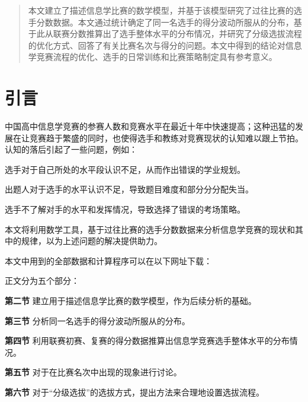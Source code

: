 \begin{abstract}
    本文建立了描述信息学比赛的数学模型，并基于该模型研究了过往比赛的选手分数数据。本文通过统计确定了同一名选手的得分波动所服从的分布，基于此从联赛分数推算出了选手整体水平的分布情况，并研究了分级选拔流程的优化方式、回答了有关比赛名次与得分的问题。本文中得到的结论对信息学竞赛流程的优化、选手的日常训练和比赛策略制定具有参考意义。
\end{abstract}

\section{引言}

    中国高中信息学竞赛的参赛人数和竞赛水平在最近十年中快速提高；这种迅猛的发展在让竞赛趋于繁盛的同时，也使得选手和教练对竞赛现状的认知难以跟上节拍。认知的落后引起了一些问题，例如：
    \begin{asparaitem}
        \item {选手对于自己所处的水平段认识不足，从而作出错误的学业规划。}
        \item {出题人对于选手的水平认识不足，导致题目难度和部分分分配失当。}
        \item {选手不了解对手的水平和发挥情况，导致选择了错误的考场策略。}
    \end{asparaitem}

    本文将利用数学工具，基于过往比赛的选手分数数据来分析信息学竞赛的现状和其中的规律，以为上述问题的解决提供助力。

    \vspace{1.5ex}

    \begin{samepage}
        本文中用到的全部数据和计算程序可以在以下网址下载：\nobreak
        \begin{compactitem}
            \item {}
            \item {}
        \end{compactitem}
    \end{samepage}

    \vspace{1.5ex}

    正文分为五个部分：

    \begin{asparaenum}
        \item [\textbf{第二节}]{建立用于描述信息学比赛的数学模型，作为后续分析的基础。}
        \item [\textbf{第三节}]{分析同一名选手的得分波动所服从的分布。}
        \item [\textbf{第四节}]{利用联赛初赛、复赛的得分数据推算出信息学竞赛选手整体水平的分布情况。}
        \item [\textbf{第五节}]{对于在比赛名次中出现的现象进行讨论。}
        \item [\textbf{第六节}]{对于“分级选拔”的选拔方式，提出方法来合理地设置选拔流程。}
    \end{asparaenum}

